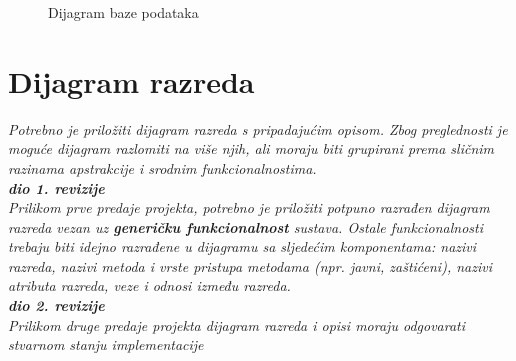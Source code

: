 			\begin{figure}[H]
				\centering
				\caption{Dijagram baze podataka}
				\label{fig:bpdiag}
			\end{figure}
			
			
			\eject
			
			
		\section{Dijagram razreda}
		
			\textit{Potrebno je priložiti dijagram razreda s pripadajućim opisom. Zbog preglednosti je moguće dijagram razlomiti na više njih, ali moraju biti grupirani prema sličnim razinama apstrakcije i srodnim funkcionalnostima.}\\
			
			\textbf{\textit{dio 1. revizije}}\\
			
			\textit{Prilikom prve predaje projekta, potrebno je priložiti potpuno razrađen dijagram razreda vezan uz \textbf{generičku funkcionalnost} sustava. Ostale funkcionalnosti trebaju biti idejno razrađene u dijagramu sa sljedećim komponentama: nazivi razreda, nazivi metoda i vrste pristupa metodama (npr. javni, zaštićeni), nazivi atributa razreda, veze i odnosi između razreda.}\\
			
			\textbf{\textit{dio 2. revizije}}\\			
			
			\textit{Prilikom druge predaje projekta dijagram razreda i opisi moraju odgovarati stvarnom stanju implementacije}
			
